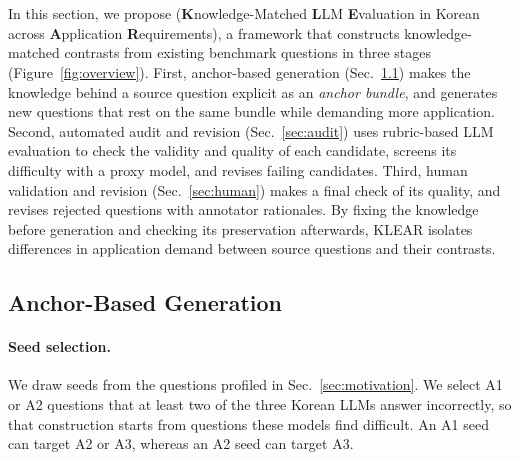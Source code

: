 \section{\name{}}
\label{sec:klear}
%

In this section, we propose \textbf{\name{}} (\textbf{K}nowledge-Matched \textbf{L}LM \textbf{E}valuation in Korean across \textbf{A}pplication \textbf{R}equirements), a framework that constructs knowledge-matched contrasts from existing benchmark questions in three stages (Figure~\ref{fig:overview}).
First, anchor-based generation (Sec.~\ref{sec:generation}) makes the knowledge behind a source question explicit as an \textit{anchor bundle}, and generates new questions that rest on the same bundle while demanding more application.
Second, automated audit and revision (Sec.~\ref{sec:audit}) uses rubric-based LLM evaluation to check the validity and quality of each candidate, screens its difficulty with a proxy model, and revises failing candidates.
Third, human validation and revision (Sec.~\ref{sec:human}) makes a final check of its quality, and revises rejected questions with annotator rationales.
By fixing the knowledge before generation and checking its preservation afterwards, KLEAR isolates differences in application demand between source questions and their contrasts.

\subsection{Anchor-Based Generation}
\label{sec:generation}

\paragraph{Seed selection.}
We draw seeds from the questions profiled in Sec.~\ref{sec:motivation}.
We select A1 or A2 questions that at least two of the three Korean LLMs answer incorrectly, so that construction starts from questions these models find difficult.
An A1 seed can target A2 or A3, whereas an A2 seed can target A3.

